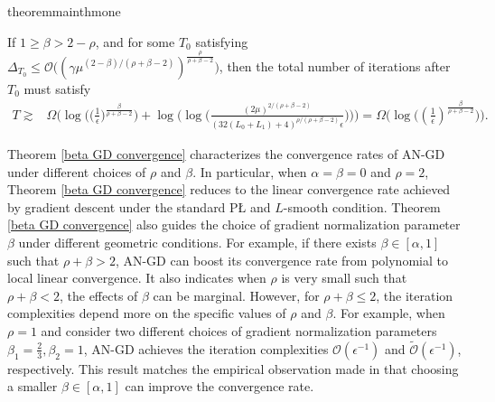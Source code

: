 \documentclass[10pt]{article} %
\begin{document}
\begin{restatable}[Convergence of AN-GD]{theorem}{mainthmone}
\begin{itemize}[leftmargin = *]
        {If $1\ge\beta>2-\rho$, and for some $T_0$ satisfying $\Delta_{T_0}\leq \mathcal{O}\big((\gamma\mu^{(2-\beta)/(\rho+\beta-2)})^{\frac{\rho}{\rho+\beta-2}}\big)$, then
        the total number of iterations after $T_0$ must satisfy}
        \begin{align}
        T\gtrsim&\Omega\Big(\log\Big(\big(\frac{1}{\epsilon}\big)^{\frac{\beta}{\rho+\beta-2}}\Big)+\log\Big(\log\Big(\frac{(2\mu)^{2/(\rho+\beta-2)}}{(32(L_0+L_1)+4)^{\rho/(\rho+\beta-2)}\epsilon}\Big)\Big)\Big)=\Omega \big(\log\big((\frac{1}{\epsilon})^{\frac{\beta}{\rho+\beta-2}}\big)\big).
        \end{align}
    \end{itemize}
\end{restatable}
Theorem \ref{beta GD convergence} characterizes the convergence rates of AN-GD under different choices of $\rho$ and $\beta$. In particular, when $\alpha=\beta=0$ and $\rho=2$, Theorem \ref{beta GD convergence} reduces to the linear convergence rate achieved by gradient descent under the standard P{\L} and $L$-smooth condition. 
Theorem \ref{beta GD convergence} also guides the choice of gradient normalization parameter $\beta$ under different geometric conditions. For example, if there exists $\beta \in [\alpha, 1]$ such that $\rho+\beta>2$, AN-GD can boost its convergence rate from polynomial to local linear convergence. It also indicates when $\rho$ is very small such that $\rho+\beta<2$, the effects of $\beta$ can be marginal. However, for $\rho+\beta\leq 2$, the iteration complexities depend more on the specific values of $\rho$ and $\beta$.
For example, 
when $\rho=1$ and consider two different choices of gradient normalization parameters $\beta_1=\frac{2}{3},\beta_2=1$, AN-GD achieves the iteration complexities $\mathcal{O}({\epsilon}^{-1})$ and $\tilde{\mathcal{O}}({\epsilon}^{-1})$, respectively. This result matches the empirical observation made in \citep{pmlr-v202-chen23ar} that choosing a smaller $\beta\in [\alpha,1]$  can improve the convergence rate.
\end{document}
